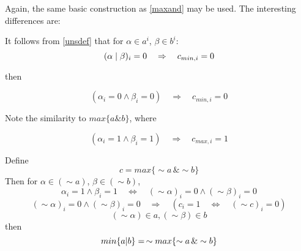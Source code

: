 \documentclass{article}
\begin{document}
Again, the same basic construction as \ref{maxand} may be used. 
The interesting differences are:

It follows from \eqref{unsdef} that for $\alpha \in a^i$, $\beta \in b^i$:
\begin{equation}
(\alpha \; \text{\textbar} \; \beta)_i = 0
\quad \Rightarrow \quad c_{min,i} = 0
\end{equation}

then

\begin{equation*}
(\alpha_i = 0  \wedge \beta_i = 0) \quad \Rightarrow \quad 
c_{min,i} = 0
\end{equation*}

Note the similarity to $max\{a\&b\}$, where

\begin{equation*}
(\alpha_i = 1  \wedge \beta_i = 1) \quad \Rightarrow \quad 
c_{max,i} = 1
\end{equation*}

Define
\begin{equation*}
c = max\{\sim a \, \& \sim b\}
\end{equation*}
Then for $\alpha \in (\sim a)$, $\beta \in (\sim b)$,
\begin{equation*}
\alpha_i = 1 \wedge \beta_i = 1 \quad \Leftrightarrow \quad 
(\sim \alpha)_i = 0 \wedge (\sim \beta)_i = 0
\end{equation*}
\begin{equation*}
(\sim \alpha)_i = 0 \wedge (\sim \beta)_i = 0 \quad \Rightarrow \quad 
(c_i = 1 \quad \Leftrightarrow \quad (\sim c)_i = 0)
\end{equation*}
\begin{equation*}
(\sim \alpha) \in a, (\sim \beta) \in b
\end{equation*}
then
\begin{equation}
min\{a\text{\textbar}b\} = \,
\sim max\{\sim a \, \& \sim b\}
\end{equation}
\end{document}
